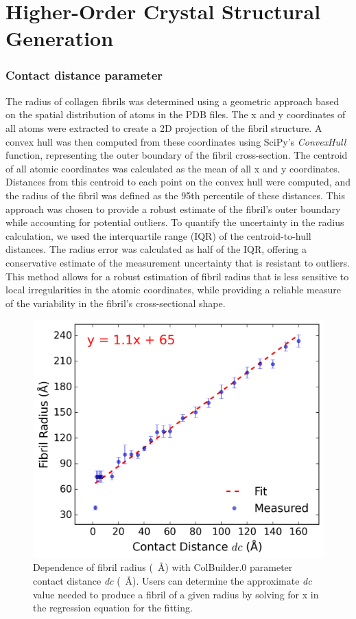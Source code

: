 \documentclass[10pt,letterpaper]{article}
\begin{document}
\section*{Higher-Order Crystal Structural Generation}

\subsubsection*{Contact distance parameter}

The radius of collagen fibrils was determined using a geometric approach based on the spatial distribution of atoms in the PDB files. The x and y coordinates of all atoms were extracted to create a 2D projection of the fibril structure. A convex hull was then computed from these coordinates using SciPy's \textit{ConvexHull} function, representing the outer boundary of the fibril cross-section. The centroid of all atomic coordinates was calculated as the mean of all x and y coordinates. Distances from this centroid to each point on the convex hull were computed, and the radius of the fibril was defined as the 95th percentile of these distances. This approach was chosen to provide a robust estimate of the fibril's outer boundary while accounting for potential outliers. To quantify the uncertainty in the radius calculation, we used the interquartile range (IQR) of the centroid-to-hull distances. The radius error was calculated as half of the IQR, offering a conservative estimate of the measurement uncertainty that is resistant to outliers. This method allows for a robust estimation of fibril radius that is less sensitive to local irregularities in the atomic coordinates, while providing a reliable measure of the variability in the fibril's cross-sectional shape.

\begin{figure}[!h]
    \centering
    \includegraphics[width=0.5\linewidth]{figures/radius_fit.png}
    \caption{Dependence of fibril radius (\SI{}{\angstrom}) with ColBuilder.0 parameter contact distance \textit{dc} (\SI{}{\angstrom}). Users can determine the approximate \textit{dc} value needed to produce a fibril of a given radius by solving for x in the regression equation for the fitting.}
    \label{fig:SI_contact_distance_vs_radius}
\end{figure}
\end{document}
